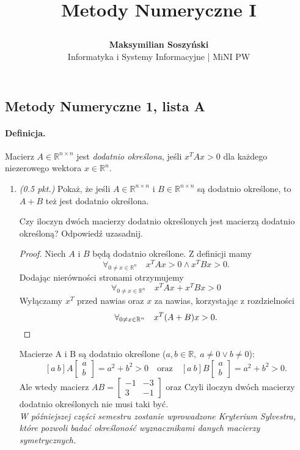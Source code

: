 \documentclass[12pt]{article}
\author{\textbf{Maksymilian Soszyński} \\ \textsf{Informatyka i Systemy Informacyjne | MiNI PW}}
\title{%

\textbf{Metody Numeryczne I}}
\date{}
\newcommand{\R}{\mathbb{R}}
\newenvironment{lista}[2][]{\newpage
\begin{center}
    \section[Lista \textbf{#2}]{Metody Numeryczne 1, lista #2}
\end{center}
\bigskip
#1
\begin{enumerate}[label=\textbf{#2\arabic*.}]}{\end{enumerate}}
\newcommand{\zad}[1][0.5]{\item \emph{(#1 pkt.) }}
\begin{document}
\maketitle


\begin{lista}[\paragraph*{Definicja.} Macierz $A\in\R^{n\times n}$ jest \emph{dodatnio określona}, jeśli $x^TAx>0$ dla każdego niezerowego wektora $x\in\R^n$.]{A}
    \zad Pokaż, że jeśli $A\in\R^{n\times n}$ i $B\in\R^{n\times n}$ są dodatnio określone, to $A + B$ też jest dodatnio określona.

    Czy iloczyn dwóch macierzy dodatnio określonych jest macierzą dodatnio określoną? Odpowiedź uzasadnij.
    \begin{mdframed}
        \begin{proof}
            Niech $A$ i $B$ będą dodatnio określone. Z definicji mamy
            \[ \forall_{0\neq x\in\R^n} \quad x^TAx > 0 \land x^TBx > 0. \]
            Dodając nierówności stronami otrzymujemy
            \[ \forall_{0\neq x\in\R^n} \quad x^TAx + x^TBx > 0 \]
            Wyłączamy $x^T$ przed nawias oraz $x$ za nawias, korzystając z rozdzielności
            \[ \forall_{0\neq x\in\R^n} \quad x^T(A+B)x > 0. \qedhere \]
        \end{proof}


        Macierze A i B są dodatnio określone ($a,b\in\R, \;a\neq0\lor b\neq0$):
        \[ [a\ b] A \begin{bmatrix} a \\ b \end{bmatrix} = a^2+b^2>0 \quad\text{oraz}\quad[a\ b] B \begin{bmatrix} a \\ b \end{bmatrix} = a^2+b^2>0.\]
        Ale wtedy macierz $AB = \begin{bmatrix} -1 & -3 \\ 3 & -1 \end{bmatrix}$ oraz
        Czyli iloczyn dwóch macierzy dodatnio określonych nie musi taki być.\\
        \emph{W późniejszej części semestru zostanie wprowadzone Kryterium Sylvestra, które pozwoli badać określoność wyznacznikami danych macierzy symetrycznych.}
    \end{mdframed}


\end{lista}
\end{document}
